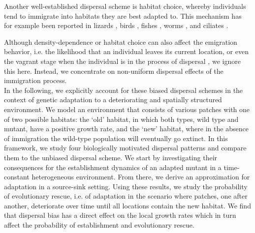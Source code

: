 \documentclass[a4paper,11pt]{article}
\newcommand{\chg}[1]{\textcolor{change}{#1}}
\begin{document}
Another well-established dispersal scheme is habitat choice, whereby individuals tend to immigrate into habitats they are best adapted to. This mechanism has for example been reported in lizards \citep{bestion_2015}, birds \citep{dreiss_2011,benkman_2017}, fishes \citep{bolnick_2009}, worms \citep{mathieu_2010}, and ciliates \citep{jacob_2017,jacob_2018}. 

\chg{Although density-dependence or habitat choice can also affect the emigration behavior, i.e. the likelihood that an individual leaves its current location, or even the vagrant stage when the individual is in the process of dispersal \citep{bowler_2005,ronce_2007}, we ignore this here. Instead, we concentrate on \chg{non-uniform} dispersal effects of the immigration process.} \\

In the following, we explicitly account for these \chg{biased} dispersal schemes in the context of genetic adaptation to a deteriorating and spatially structured environment. We model an environment that consists of various patches with one of two possible habitats: the `old' habitat, in which both \chg{types, wild type and mutant, have a positive growth rate}, and the `new' habitat, where in the absence of immigration the wild-type population will eventually go extinct. In this framework, we study four biologically motivated dispersal patterns and compare them to the \chg{unbiased} dispersal scheme. We start by investigating their consequences for the establishment dynamics of an adapted mutant in a time-constant heterogeneous environment. 
From there, we derive an approximation for adaptation in a source-sink setting.
Using these results, we study the probability of evolutionary rescue, i.e. of adaptation in the scenario where patches, one after \chg{another}, deteriorate over time until all locations contain the new habitat. We find that dispersal bias has a direct effect on the local growth rates which in turn affect the probability of establishment and evolutionary rescue.

\end{document}
